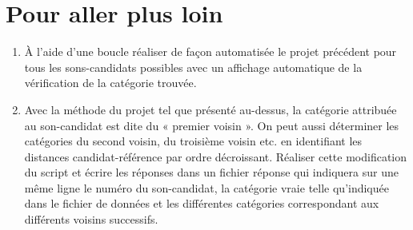 \section{Pour aller plus loin}

\begin{enumerate}
 \item À l'aide d'une boucle réaliser de façon automatisée le projet précédent pour tous les sons-candidats possibles avec un affichage automatique de la vérification de la catégorie trouvée.
 \item Avec la méthode du projet tel que présenté au-dessus, la catégorie attribuée au son-candidat est dite du « premier voisin ». On peut aussi déterminer les catégories du second voisin, du troisième voisin etc. en identifiant les distances candidat-référence par ordre décroissant. Réaliser cette modification du script et écrire les réponses dans un fichier réponse qui indiquera sur une même ligne le numéro du son-candidat, la catégorie vraie telle qu'indiquée dans le fichier de données et les différentes catégories correspondant aux différents voisins successifs.
\end{enumerate}


